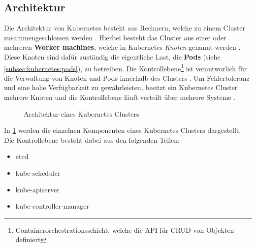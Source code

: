 \subsection{Architektur}
\label{subsec:kubernetes:architecture}
Die Architektur von Kubernetes besteht aus Rechnern, welche zu einem Cluster zusammengeschlossen werden \cite{kubernetesComponents}.
Hierbei besteht das Cluster aus einer oder mehreren \textbf{Worker machines}, welche in Kubernetes \emph{Knoten}
genannt werden \cite{kubernetesComponents}. Diese Knoten sind dafür zuständig die eigentliche Last, die \textbf{Pods} (siehe \ref{subsec:kubernetes:pods}), zu betreiben.
Die Kontrollebene\footnote{Containerorchestrationsschicht, welche die API für CRUD von Objekten definiert}
ist verantworlich für die Verwaltung von Knoten und Pods innerhalb des Clusters \cite{kubernetesComponents}. 
Um Fehlertoleranz und eine hohe Verfügbarkeit zu gewährleisten, besitzt ein Kubernetes Cluster mehrere Knoten und
die Kontrollebene läuft verteilt über mehrere Systeme \cite{kubernetesComponents}. 

\begin{figure}
  \centering
  \caption{Architektur eines Kubernetes Clusters}
  \label{fig:kubernetes_architecture}
\end{figure}

In \ref{fig:kubernetes_architecture} werden die einzelnen Komponenten eines Kubernetes Clusters dargestellt.
Die Kontrollebene besteht dabei aus den folgenden Teilen:
\begin{itemize}
  \item etcd
  \item kube-scheduler
  \item kube-apiserver
  \item kube-controller-manager
\end{itemize}


